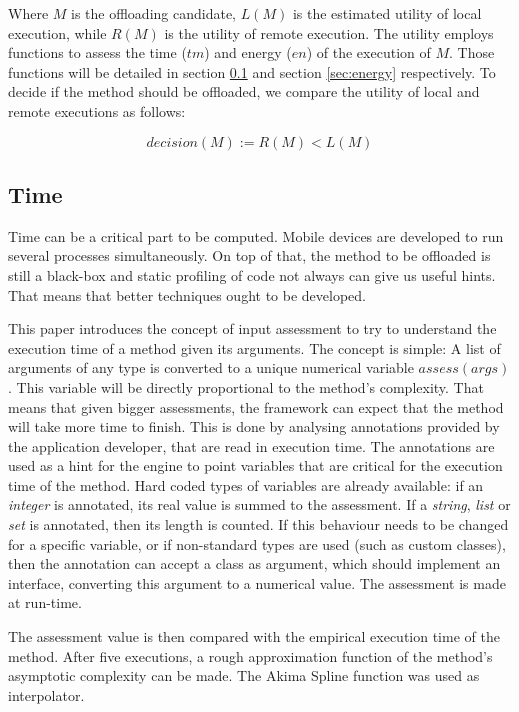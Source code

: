 \documentclass[10pt, conference, letterpaper]{IEEEtran}
\begin{document}
  Where $M$ is the offloading candidate, $L(M)$ is the estimated utility of local execution, while $R(M)$ is the utility of remote execution. The utility employs functions to assess the time ($tm$) and energy ($en$) of the execution of $M$. Those functions will be detailed in section \ref{sec:time} and section \ref{sec:energy} respectively. To decide if the method should be offloaded, we compare the utility of local and remote executions as follows: 

  \begin{equation}
    decision(M) := R(M) < L(M)
  \end{equation}

  \subsection{Time} \label{sec:time}
  Time can be a critical part to be computed. Mobile devices are developed to run several processes simultaneously. On top of that, the method to be offloaded is still a black-box and static profiling of code not always can give us useful hints. That means that better techniques ought to be developed.
  
  This paper introduces the concept of input assessment to try to understand the execution time of a method given its arguments. The concept is simple: A list of arguments of any type is converted to a unique numerical variable $assess(args)$. This variable will be directly proportional to the method's complexity. That means that given bigger assessments, the framework can expect that the method will take more time to finish. This is done by analysing annotations provided by the application developer, that are read in execution time. The annotations are used as a hint for the engine to point variables that are critical for the execution time of the method. Hard coded types of variables are already available: if an \textit{integer} is annotated, its real value is summed to the assessment. If a \textit{string}, \textit{list} or \textit{set} is annotated, then its length is counted. If this behaviour needs to be changed for a specific variable, or if non-standard types are used (such as custom classes), then the annotation can accept a class as argument, which should implement an interface, converting this argument to a numerical value. The assessment is made at run-time. 

  The assessment value is then compared with the empirical execution time of the method. After five executions, a rough approximation function of the method's asymptotic complexity can be made. The Akima Spline function was used as interpolator.
\end{document}
